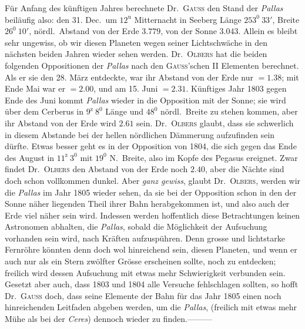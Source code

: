 Für Anfang des künftigen Jahres berechnete Dr.\ \textsc{Gauss} den Stand der \textit{Pallas} beiläufig also: den 31. Dec.\ um $12^{\mathrm{u}}$ Mitternacht in Seeberg Länge $253^0\ 33'$, Breite $26^0\ 10'$, nördl.\ Abstand von der Erde $3.779$, von der Sonne $3.043$. Allein es bleibt sehr ungewiss, ob wir diesen Planeten wegen seiner Lichtschwäche
%
in den nächsten beiden Jahren wieder sehen werden. Dr.\ \textsc{Olbers} hat die beiden folgenden Oppositionen der \textit{Pallas} nach den \textsc{Gauss}'schen II Elementen berechnet. Als er sie den 28. März entdeckte, war ihr Abstand von der Erde nur $=1.38$; mit Ende Mai war er $=2.00$, und am 15. Juni $=2.31$. Künftiges Jahr 1803 gegen Ende des Juni kommt \textit{Pallas} wieder in die Opposition mit der Sonne; sie wird über dem Cerberus in $9^{\mathrm{z}}\ 8^0$ Länge und $48^0$ nördl.\ Breite zu stehen kommen, aber ihr Abstand von der Erde wird $2.61$ sein. Dr.\ \textsc{Olbers} glaubt, dass sie schwerlich in diesem Abstande bei der hellen nördlichen Dämmerung aufzufinden sein dürfte. Etwas besser geht es in der Opposition von 1804, die sich gegen das Ende des August in $11^{\mathrm{z}}\ 3^0$ mit $19^0$ N.\ Breite, also im Kopfe des Pegasus ereignet. Zwar findet Dr.\ \textsc{Olbers} den Abstand von der Erde noch $2.40$, aber die Nächte sind doch schon vollkommen dunkel. Aber \textit{ganz gewiss}, glaubt Dr.\ \textsc{Olbers}, werden wir die \textit{Pallas} im Jahr 1805 wieder sehen, da sie bei der Opposition schon in den der Sonne näher liegenden Theil ihrer Bahn herabgekommen ist, und also auch der Erde viel näher sein wird. Indessen werden hoffentlich diese Betrachtungen keinen Astronomen abhalten, die \textit{Pallas}, sobald die Möglichkeit der Aufsuchung vorhanden sein wird, nach Kräften aufzuspühren. Denn grosse und lichtstarke Fernröhre könnten denn doch wol hinreichend sein, diesen Planeten, und wenn er auch nur als ein Stern zwölfter Grösse erscheinen sollte, noch zu entdecken; freilich wird dessen Aufsuchung mit etwas mehr Schwierigkeit verbunden sein. Gesetzt aber auch, dass 1803 und 1804 alle Versuche fehlschlagen sollten, so hofft Dr.\ \textsc{Gauss} doch, dass seine Elemente der Bahn für das Jahr 1805 einen noch hinreichenden Leitfaden abgeben werden, um die \textit{Pallas}, (freilich mit etwas mehr Mühe als bei der \textit{Ceres}) dennoch wieder zu finden.\quad —\quad —\quad —

